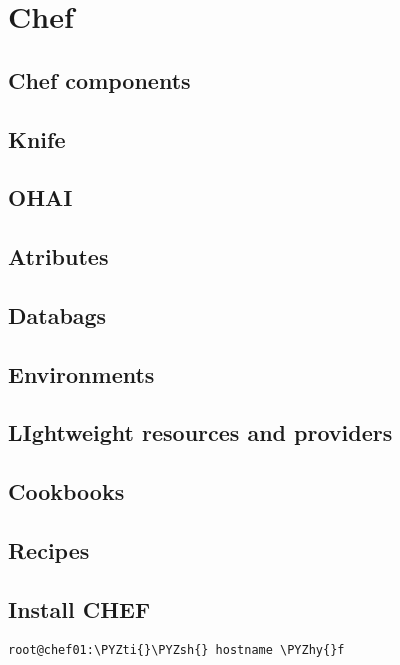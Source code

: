 \chapter{Chef}

\section{Chef components}

\section{Knife}

\section{OHAI}

\section{Atributes}

\section{Databags}

\section{Environments}

\section{LIghtweight resources and providers}

\section{Cookbooks}

\section{Recipes}

\section{Install CHEF}


\begin{codelisting}
\label{code:hostname}
\codecaption{}
\begin{Verbatim}[fontsize=\relsize{-2.5},fontseries=b,commandchars=\\\{\}]
root@chef01:\PYZti{}\PYZsh{} hostname \PYZhy{}f
\end{Verbatim}
\end{codelisting}

